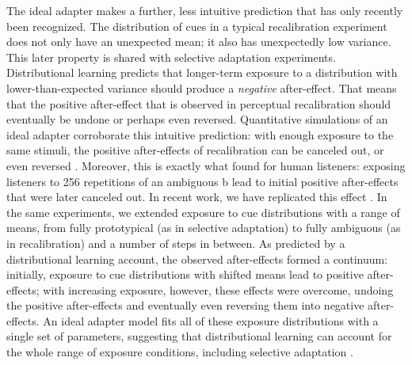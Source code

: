 The ideal adapter makes a further, less intuitive prediction that has only recently been recognized. The distribution of cues in a typical recalibration experiment does not only have an unexpected mean; it also has unexpectedly low variance. This later property is shared with selective adaptation experiments. Distributional learning predicts that longer-term exposure to a distribution with lower-than-expected variance should produce a \emph{negative} after-effect. That means that the positive after-effect that is observed in perceptual recalibration should eventually be undone or perhaps even reversed. Quantitative simulations of an ideal adapter corroborate this intuitive prediction: with enough exposure to the same stimuli, the positive after-effects of recalibration can be canceled out, or even reversed \autocite[pp. 164-6]{Kleinschmidt2015}.  Moreover, this is exactly what \textcite{Vroomen2007} found for human listeners: exposing listeners to 256 repetitions of an ambiguous \ph b lead to initial positive after-effects that were later canceled out.  In recent work, we have replicated this effect \autocite{Kleinschmidt2012c}. In the same experiments, we extended exposure to cue distributions with a range of means, from fully prototypical (as in selective adaptation) to fully ambiguous (as in recalibration) and a number of steps in between.  As predicted by a distributional learning account, the observed after-effects formed a continuum: initially, exposure to cue distributions with shifted means lead to positive after-effects; with increasing exposure, however, these effects were overcome, undoing the positive after-effects and eventually even reversing them into negative after-effects. An ideal adapter model fits all of these exposure distributions with a single set of parameters, suggesting that distributional learning can account for the whole range of exposure conditions, including selective adaptation \autocite{Kleinschmidt2015}.  

